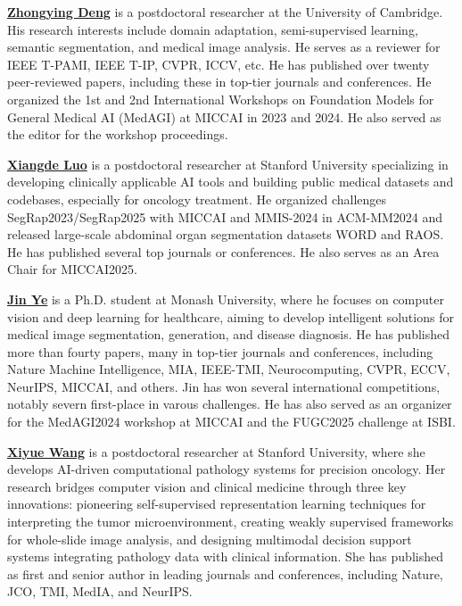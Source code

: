 \documentclass{article}
\begin{document}
\noindent
\textbf{\href{https://zhongying-deng.github.io/}{Zhongying Deng}} is a postdoctoral researcher at the University of Cambridge. His research interests include domain adaptation, semi-supervised learning, semantic segmentation, and medical image analysis. He serves as a reviewer for IEEE T-PAMI, IEEE T-IP, CVPR, ICCV, etc. He has published over twenty peer-reviewed papers, including these in top-tier journals and conferences. He organized the 1st and 2nd International Workshops on Foundation Models for General Medical AI (MedAGI) at MICCAI in 2023 and 2024. He also served as the editor for the workshop proceedings. %

\noindent
\textbf{\href{https://zhongying-deng.github.io/}{Xiangde Luo}} is a postdoctoral researcher at Stanford University specializing in developing clinically applicable AI tools and building public medical datasets and codebases, especially for oncology treatment. He organized challenges SegRap2023/SegRap2025 with MICCAI and MMIS-2024 in ACM-MM2024 and released large-scale abdominal organ segmentation datasets WORD and RAOS. He has published several top journals or conferences. He also serves as an Area Chair for MICCAI2025.

\noindent
\textbf{\href{https://yejin0111.github.io/}{Jin Ye}} is a Ph.D. student at Monash University, where he focuses on computer vision and deep learning for healthcare, aiming to develop intelligent solutions for medical image segmentation, generation, and disease diagnosis. He has published more than fourty papers, many in top-tier journals and conferences, including Nature Machine Intelligence, MIA, IEEE-TMI, Neurocomputing, CVPR, ECCV, NeurIPS, MICCAI, and others. Jin has won several international competitions, notably severn first-place in varous challenges. He has also served as an organizer for the MedAGI2024 workshop at MICCAI and the FUGC2025 challenge at ISBI.

\noindent
\textbf{\href{https://profiles.stanford.edu/xiyue-wang}{Xiyue Wang}} is a postdoctoral researcher at Stanford University, where she develops AI-driven computational pathology systems for precision oncology. Her research bridges computer vision and clinical medicine through three key innovations: pioneering self-supervised representation learning techniques for interpreting the tumor microenvironment, creating weakly supervised frameworks for whole-slide image analysis, and designing multimodal decision support systems integrating pathology data with clinical information. She has published as first and senior author in leading journals and conferences, including Nature, JCO, TMI, MedIA, and NeurIPS.
\end{document}
